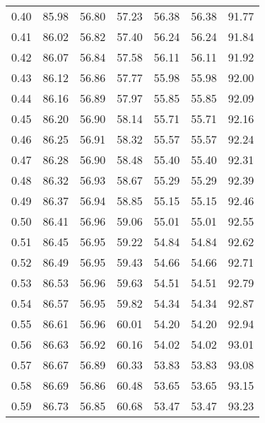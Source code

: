 \begin{tabular}{|c|c|c|c|c|c|c|}
      0.40 &     85.98 &     56.80 &      57.23 &   56.38 &      56.38 &         91.77 \\
      0.41 &     86.02 &     56.82 &      57.40 &   56.24 &      56.24 &         91.84 \\
      0.42 &     86.07 &     56.84 &      57.58 &   56.11 &      56.11 &         91.92 \\
      0.43 &     86.12 &     56.86 &      57.77 &   55.98 &      55.98 &         92.00 \\
      0.44 &     86.16 &     56.89 &      57.97 &   55.85 &      55.85 &         92.09 \\
      0.45 &     86.20 &     56.90 &      58.14 &   55.71 &      55.71 &         92.16 \\
      0.46 &     86.25 &     56.91 &      58.32 &   55.57 &      55.57 &         92.24 \\
      0.47 &     86.28 &     56.90 &      58.48 &   55.40 &      55.40 &         92.31 \\
      0.48 &     86.32 &     56.93 &      58.67 &   55.29 &      55.29 &         92.39 \\
      0.49 &     86.37 &     56.94 &      58.85 &   55.15 &      55.15 &         92.46 \\
      0.50 &     86.41 &     56.96 &      59.06 &   55.01 &      55.01 &         92.55 \\
      0.51 &     86.45 &     56.95 &      59.22 &   54.84 &      54.84 &         92.62 \\
      0.52 &     86.49 &     56.95 &      59.43 &   54.66 &      54.66 &         92.71 \\
      0.53 &     86.53 &     56.96 &      59.63 &   54.51 &      54.51 &         92.79 \\
      0.54 &     86.57 &     56.95 &      59.82 &   54.34 &      54.34 &         92.87 \\
      0.55 &     86.61 &     56.96 &      60.01 &   54.20 &      54.20 &         92.94 \\
      0.56 &     86.63 &     56.92 &      60.16 &   54.02 &      54.02 &         93.01 \\
      0.57 &     86.67 &     56.89 &      60.33 &   53.83 &      53.83 &         93.08 \\
      0.58 &     86.69 &     56.86 &      60.48 &   53.65 &      53.65 &         93.15 \\
      0.59 &     86.73 &     56.85 &      60.68 &   53.47 &      53.47 &         93.23 \\

\end{tabular}
